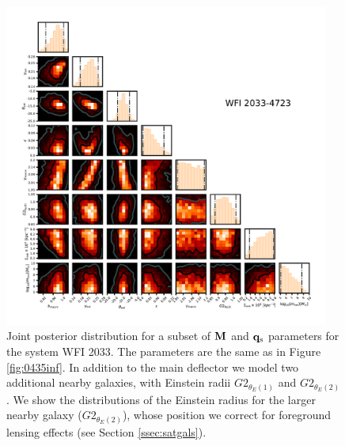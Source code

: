 \begin{figure}
	\includegraphics[clip,trim=1.5cm 1.6cm 1cm
	1cm,width=0.95\textwidth,keepaspectratio]{./figures_wdmchillsout//joint2033.pdf}
	\caption{\label{fig:02033inf} Joint posterior distribution for a subset of ${\bf{M}}$ and ${\bf{q}_{\rm{s}}}$ parameters for the system WFI 2033. The parameters are the same as in Figure \ref{fig:0435inf}. In addition to the main deflector we model two additional nearby galaxies, with Einstein radii $G2_{\theta_E(1)}$ and $G2_{\theta_E(2)}$. We show the distributions of the Einstein radius for the larger nearby galaxy ($G2_{\theta_E(2)}$), whose position we correct for foreground lensing effects (see Section \ref{ssec:satgals}). }
\end{figure}	

